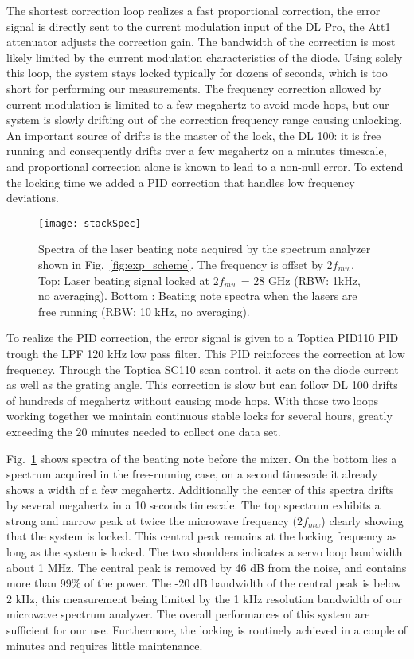 \documentclass[pra, reprint]{revtex4-1}
\begin{document}
The shortest correction loop realizes a fast proportional correction, the error signal is directly sent to the current modulation input of the DL Pro, the Att1 attenuator adjusts the correction gain. The bandwidth of the correction is most likely limited by the current modulation characteristics of the diode. Using solely this loop, the system stays locked typically for dozens of seconds, which is too short for performing our measurements. The frequency correction allowed by current modulation is limited to a few megahertz to avoid mode hops, but our system is slowly drifting out of the correction frequency range causing unlocking. An important source of drifts is the master of the lock, the DL 100: it is free running and consequently drifts over a few megahertz on a minutes timescale, and proportional correction alone is known to lead to a non-null error. To extend the locking time we added a PID correction that handles low frequency deviations.

\begin{figure}[h]
  \centering
  \texttt{[image: stackSpec]}
  \caption{Spectra of the laser beating note acquired by the spectrum analyzer shown in Fig.~\ref{fig:exp_scheme}. The frequency is offset by $2f_{mw}$.
Top: Laser beating signal locked at $2f_{mw}$ = 28 GHz (RBW: 1kHz, no averaging).
Bottom : Beating note spectra when the lasers are free running (RBW: 10 kHz, no averaging).}
  \label{fig:beat_spec}
\end{figure}
To realize the PID correction, the error signal is given to a Toptica PID110 PID trough the LPF 120 kHz low pass filter. This PID reinforces the correction at low frequency. Through the Toptica SC110 scan control, it acts on the diode current as well as the grating angle. This correction is slow but can follow DL 100 drifts of hundreds of megahertz without causing mode hops.
With those two loops working together we maintain continuous stable locks for several hours, greatly exceeding the 20 minutes needed to collect one data set.


Fig.~\ref{fig:beat_spec} shows spectra of the beating note before the mixer. On the bottom lies a spectrum acquired in the free-running case, on a second timescale it already shows a width of a few megahertz. Additionally the center of this spectra drifts by several megahertz in a 10 seconds timescale.
The top spectrum exhibits a strong and narrow peak at twice the microwave frequency ($2f_{mw}$) clearly showing that the system is locked. This central peak remains at the locking frequency as long as the system is locked. The two shoulders indicates a servo loop bandwidth about 1 MHz. The central peak is removed by 46 dB from the noise, and contains more than 99\% of the power. The -20 dB bandwidth of the central peak is below 2 kHz, this measurement being limited by the 1 kHz resolution bandwidth of our microwave spectrum analyzer. The overall performances of this system are sufficient for our use. Furthermore, the locking is routinely achieved in a couple of minutes and requires little maintenance.
\end{document}
